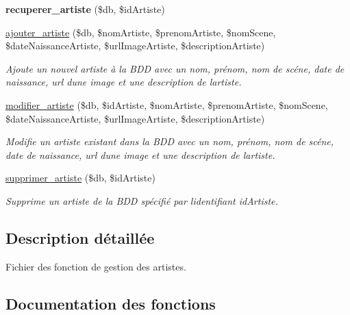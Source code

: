 \begin{DoxyCompactItemize}
\mbox{\label{fonctionArtiste_8php_a7f39d756570b5bfa910f3bd18640fba1}} 
{\bfseries recuperer\+\_\+artiste} (\$db, \$id\+Artiste)
\item 
\hyperlink{fonctionArtiste_8php_acb048e0328e3e7025c55f386c1ec007e}{ajouter\+\_\+artiste} (\$db, \$nom\+Artiste, \$prenom\+Artiste, \$nom\+Scene, \$date\+Naissance\+Artiste, \$url\+Image\+Artiste, \$description\+Artiste)
\begin{DoxyCompactList}\small\item\em Ajoute un nouvel artiste à la B\+DD avec un nom, prénom, nom de scéne, date de naissance, url d\textquotesingle{}une image et une description de l\textquotesingle{}artiste. \end{DoxyCompactList}\item 
\hyperlink{fonctionArtiste_8php_a9f58e3dc0958d3b8e7392796649c01ed}{modifier\+\_\+artiste} (\$db, \$id\+Artiste, \$nom\+Artiste, \$prenom\+Artiste, \$nom\+Scene, \$date\+Naissance\+Artiste, \$url\+Image\+Artiste, \$description\+Artiste)
\begin{DoxyCompactList}\small\item\em Modifie un artiste existant dans la B\+DD avec un nom, prénom, nom de scéne, date de naissance, url d\textquotesingle{}une image et une description de l\textquotesingle{}artiste. \end{DoxyCompactList}\item 
\hyperlink{fonctionArtiste_8php_a8586d94e19d8dd5c149ae508f2e4d26a}{supprimer\+\_\+artiste} (\$db, \$id\+Artiste)
\begin{DoxyCompactList}\small\item\em Supprime un artiste de la B\+DD spécifié par l\textquotesingle{}identifiant \textquotesingle{}id\+Artiste\textquotesingle{}. \end{DoxyCompactList}\end{DoxyCompactItemize}


\subsection{Description détaillée}
Fichier des fonction de gestion des artistes. 



\subsection{Documentation des fonctions}
\mbox{\label{fonctionArtiste_8php_acb048e0328e3e7025c55f386c1ec007e}} 
